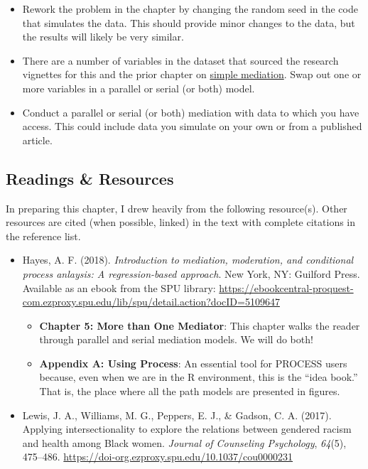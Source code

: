 \documentclass[
]{book}
\providecommand{\tightlist}{%
  \setlength{\itemsep}{0pt}\setlength{\parskip}{0pt}}
\begin{document}
\begin{itemize}
\tightlist
\item
  Rework the problem in the chapter by changing the random seed in the code that simulates the data. This should provide minor changes to the data, but the results will likely be very similar.
\item
  There are a number of variables in the dataset that sourced the research vignettes for this and the prior chapter on \protect\hyperlink{SimpleMed}{simple mediation}. Swap out one or more variables in a parallel or serial (or both) model.
\item
  Conduct a parallel or serial (or both) mediation with data to which you have access. This could include data you simulate on your own or from a published article.
\end{itemize}

\hypertarget{readings-resources-5}{%
\subsection{Readings \& Resources}\label{readings-resources-5}}

In preparing this chapter, I drew heavily from the following resource(s). Other resources are cited (when possible, linked) in the text with complete citations in the reference list.

\begin{itemize}
\tightlist
\item
  Hayes, A. F. (2018). \emph{Introduction to mediation, moderation, and conditional process anlaysis: A regression-based approach}. New York, NY: Guilford Press. Available as an ebook from the SPU library: \url{https://ebookcentral-proquest-com.ezproxy.spu.edu/lib/spu/detail.action?docID=5109647}

  \begin{itemize}
  \tightlist
  \item
    \textbf{Chapter 5: More than One Mediator}: This chapter walks the reader through parallel and serial mediation models. We will do both!
  \item
    \textbf{Appendix A: Using Process}: An essential tool for PROCESS users because, even when we are in the R environment, this is the ``idea book.'' That is, the place where all the path models are presented in figures.
  \end{itemize}
\item
  Lewis, J. A., Williams, M. G., Peppers, E. J., \& Gadson, C. A. (2017). Applying intersectionality to explore the relations between gendered racism and health among Black women. \emph{Journal of Counseling Psychology}, \emph{64}(5), 475--486. \url{https://doi-org.ezproxy.spu.edu/10.1037/cou0000231}
\end{itemize}
\end{document}
